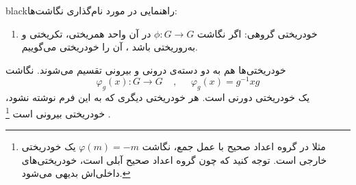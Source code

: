 \documentclass{article}
\begin{document}
\begin{boxes}{black}{راهنمایی در مورد نام‌گذاری نگاشت‌ها:}
\begin{enumerate}
		\item 
		خودریختی گروهی: اگر نگاشت 
		$\phi : G \to G$
		در آن واحد همریختی، تکریختی و به‌روریختی باشد
		، آن را خودریختی می‌گوییم.
	\end{enumerate}
	خودریختی‌ها هم به دو دسته‌ی درونی و بیرونی تقسیم می‌شوند.
	نگاشت 
	\begin{equation}
		\varphi_g (x) : G \to G \;\;\;\;,\;\;\;\;\; \varphi_g(x) = g^{-1}xg
		\label{auto}
	\end{equation}
	یک خودریختی دورنی است. هر خودریختی دیگری که به این فرم نوشته‌ نشود، خودریختی بیرونی است
	\footnote{مثلا در گروه اعداد صحیح با عمل جمع، نگاشت 
		$\varphi(m) = -m$
		یک خودریختی خارجی است. توجه کنید که چون گروه اعداد صحیح آبلی است، خودریختی‌های داخلی‌اش بدیهی می‌شود.
	}
	.
	
\end{boxes}

\newpage

 
\end{document}
